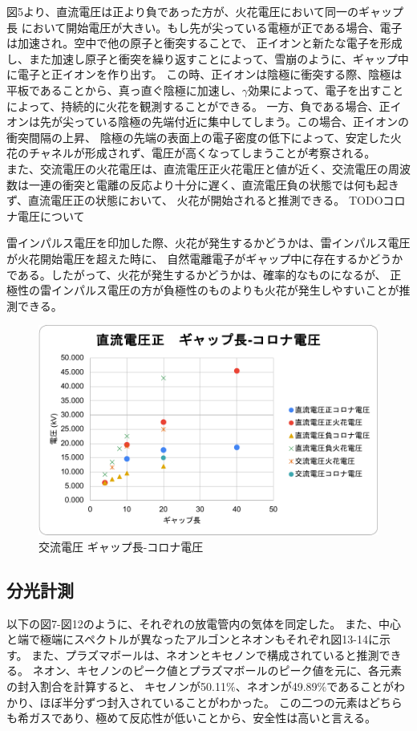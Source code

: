 \documentclass[a4j,twocolumn]{jsarticle}
\begin{document}
図5より、直流電圧は正より負であった方が、火花電圧において同一のギャップ長
において開始電圧が大きい。もし先が尖っている電極が正である場合、電子は加速され。空中で他の原子と衝突することで、
正イオンと新たな電子を形成し、また加速し原子と衝突を繰り返すことによって、雪崩のように、ギャップ中に電子と正イオンを作り出す。
この時、正イオンは陰極に衝突する際、陰極は平板であることから、真っ直ぐ陰極に加速し、$\gamma$効果によって、電子を出すことによって、持続的に火花を観測することができる。
一方、負である場合、正イオンは先が尖っている陰極の先端付近に集中してしまう。この場合、正イオンの衝突間隔の上昇、
陰極の先端の表面上の電子密度の低下によって、安定した火花のチャネルが形成されず、電圧が高くなってしまうことが考察される。\\

また、交流電圧の火花電圧は、直流電圧正火花電圧と値が近く、交流電圧の周波数は一連の衝突と電離の反応より十分に遅く、直流電圧負の状態では何も起きず、直流電圧正の状態において、
火花が開始されると推測できる。
TODOコロナ電圧について


雷インパルス電圧を印加した際、火花が発生するかどうかは、雷インパルス電圧が火花開始電圧を超えた時に、
自然電離電子がギャップ中に存在するかどうかである。したがって、火花が発生するかどうかは、確率的なものになるが、
正極性の雷インパルス電圧の方が負極性のものよりも火花が発生しやすいことが推測できる。



\begin{figure}[htb]
    \centering
    \includegraphics[keepaspectratio,width=0.6\columnwidth]{fig/disparity.pdf}
    \caption{交流電圧 ギャップ長-コロナ電圧}
\end{figure}



\subsection*{分光計測}
以下の図7-図12のように、それぞれの放電管内の気体を同定した。
また、中心と端で極端にスペクトルが異なったアルゴンとネオンもそれぞれ図13-14に示す。
また、プラズマボールは、ネオンとキセノンで構成されていると推測できる。
ネオン、キセノンのピーク値とプラズマボールのピーク値を元に、各元素の封入割合を計算すると、
キセノンが50.11$\%$、ネオンが49.89$\%$であることがわかり、ほぼ半分ずつ封入されていることがわかった。
この二つの元素はどちらも希ガスであり、極めて反応性が低いことから、安全性は高いと言える。
\end{document}

